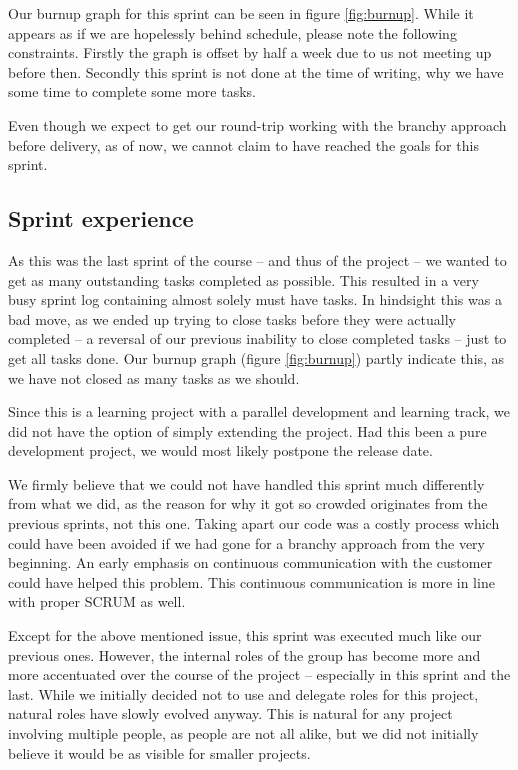 \documentclass[a4paper,11pt]{article}
\begin{document}
Our burnup graph for this sprint can be seen in figure \ref{fig:burnup}. While
it appears as if we are hopelessly behind schedule, please note the following
constraints. Firstly the graph is offset by half a week due to us not meeting up
before then. Secondly this sprint is not done at the time of writing, why we
have some time to complete some more tasks.

Even though we expect to get our round-trip working with the branchy approach
before delivery, as of now, we cannot claim to have reached the goals for this
sprint.

\subsection{Sprint experience}
\label{sec:sprint_experience}
As this was the last sprint of the course -- and thus of the project -- we
wanted to get as many outstanding tasks completed as possible. This resulted in
a very busy sprint log containing almost solely must have tasks. In hindsight
this was a bad move, as we ended up trying to close tasks before they were
actually completed -- a reversal of our previous inability to close completed
tasks -- just to get all tasks done. Our burnup graph (figure \ref{fig:burnup})
partly indicate this, as we have not closed as many tasks as we should.

Since this is a learning project with a parallel development and learning
track, we did not have the option of simply extending the project. Had this been
a pure development project, we would most likely postpone the release date.

We firmly believe that we could not have handled this sprint much differently
from what we did, as the reason for why it got so crowded originates from the
previous sprints, not this one. Taking apart our code was a costly process which
could have been avoided if we had gone for a branchy approach from the very
beginning. An early emphasis on continuous communication with the customer could
have helped this problem. This continuous communication is more in line with
proper SCRUM as well.

Except for the above mentioned issue, this sprint was executed much like our
previous ones. However, the internal roles of the group has become more and more
accentuated over the course of the project -- especially in this sprint and the
last. While we
initially decided not to use and delegate roles for this project, natural roles
have slowly evolved anyway. This is natural for any project involving multiple
people, as people are not all alike, but we did not initially believe it would
be as visible for smaller projects.
\end{document}

